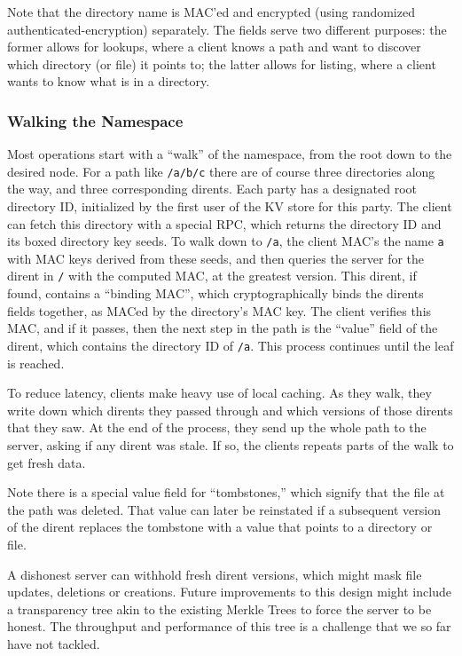 Note that the directory name is MAC'ed and encrypted (using randomized
authenticated-encryption) separately.  The fields serve two different purposes:
the former allows for lookups, where a client knows a path and want to discover
which directory (or file) it points to; the latter allows for listing,
where a client wants to know what is in a directory.

\subsubsection{Walking the Namespace}
\label{sec:walk}

Most operations start with a ``walk'' of the namespace, from the root down to the desired node.
For a path like \texttt{/a/b/c} there are of course three directories along the way,
and three corresponding dirents.  Each party has a designated root directory ID, initialized
by the first user of the KV store for this party. The client can fetch this directory 
with a special RPC, which returns the directory ID and its boxed directory key seeds.
To walk down to \texttt{/a}, the client MAC's the name \texttt{a} with MAC keys 
derived from these seeds, and then queries the server for the dirent in \texttt{/}
with the computed MAC, at the greatest version. This dirent, if found, contains a
``binding MAC'', which cryptographically binds the dirents fields together, as MACed
by the directory's MAC key. The client verifies this MAC, and if it passes, then the next
step in the path is the ``value'' field of the dirent, which contains the directory ID
of \texttt{/a}. This process continues until the leaf is reached.

To reduce latency, clients make heavy use of local caching. As they walk, they write down
which dirents they passed through and which versions of those dirents that they saw.
At the end of the process, they send up the whole path to the server, asking if any dirent
was stale. If so, the clients repeats parts of the walk to get fresh data. 

Note there is a special value field for ``tombstones,'' which signify that the 
file at the path was deleted. That value can later be reinstated if a subsequent version
of the dirent replaces the tombstone with a value that points to a directory or file.

A dishonest server can withhold fresh dirent versions, which might mask file
updates, deletions or creations. Future improvements to this design might
include a transparency tree akin to the existing Merkle Trees to force the
server to be honest. The throughput and performance of this tree is a challenge
that we so far have not tackled.

